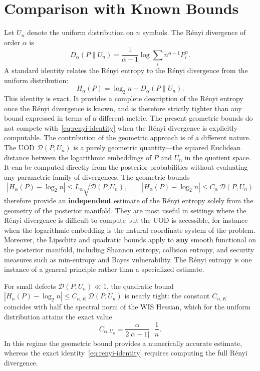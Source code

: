 \section{Comparison with Known Bounds}\label{ch:sec:comparison-with-known-bounds}
Let \(U_n\) denote the uniform distribution on \(n\) symbols. The
R\'enyi divergence of order \(\alpha\) is
\[
D_\alpha(P\|U_n)=\frac1{\alpha-1}\log\sum_i n^{\alpha-1}P_i^{\alpha}.
\]
A standard identity \cite{vanerven2014renyi} relates the R\'enyi
entropy to the R\'enyi divergence from the uniform distribution:
\[ H_\alpha(P) = \log_2 n - D_\alpha(P\|U_n). \tag{16.1}\label{eq:renyi-identity} \]
This identity is exact. It provides a complete description of the
R\'enyi entropy once the R\'enyi divergence is known, and is therefore
strictly tighter than any bound expressed in terms of a different
metric. The present geometric bounds do not compete with~\eqref{eq:renyi-identity} when the
R\'enyi divergence is explicitly computable.
The contribution of the geometric approach is of a different nature.
The UOD \(\mathcal D(P,U_n)\) is a purely geometric quantity---the
squared Euclidean distance between the logarithmic embeddings of \(P\)
and \(U_n\) in the quotient space. It can be computed directly from the
posterior probabilities without evaluating any parametric family of
divergences. The geometric bounds
\[
|H_\alpha(P)-\log_2 n| \le L_\alpha\sqrt{\mathcal D(P,U_n)},
\qquad
|H_\alpha(P)-\log_2 n| \le C_\alpha\,\mathcal D(P,U_n)
\]
therefore provide an \textbf{independent} estimate of the R\'enyi entropy
solely from the geometry of the posterior manifold. They are most useful
in settings where the R\'enyi divergence is difficult to compute but the
UOD is accessible, for instance when the logarithmic embedding is the
natural coordinate system of the problem.
Moreover, the Lipschitz and quadratic bounds apply to \textbf{any} smooth
functional on the posterior manifold, including Shannon entropy,
collision entropy, and security measures such as min-entropy and Bayes
vulnerability. The R\'enyi entropy is one instance of a general
principle rather than a specialized estimate.
\begin{remark}
For small defects \(\mathcal D(P,U_n)\ll 1\), the quadratic bound
$|H_\alpha(P)-\log_2 n| \le C_{\alpha,K}\,\mathcal D(P,U_n)$
is nearly tight: the constant \(C_{\alpha,K}\) coincides with half the
spectral norm of the WIS Hessian, which for the uniform distribution
attains the exact value
\[
C_{\alpha,U_n}
=
\frac{\alpha}{2|\alpha-1|}\cdot\frac{1}{n}.
\]
In this regime the geometric bound provides a numerically accurate
estimate, whereas the exact identity~\eqref{eq:renyi-identity} requires computing the
full R\'enyi divergence.
\end{remark}

